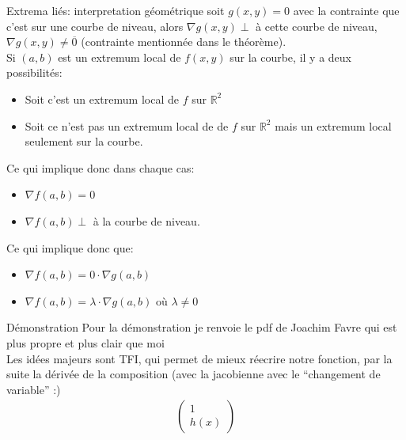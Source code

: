 \begin{parag}{Extrema liés: interpretation géométrique}
    soit $g\left(x, y\right) = 0 $ avec la contrainte que c'est sur une courbe de niveau, alors $\nabla g\left(x, y\right) \perp $ à cette courbe de niveau, $\nabla g\left(x, y\right) \neq \overline{0}$ (contrainte mentionnée dans le théorème).\\
    Si $\left(a, b\right)$ est un extremum local de $f\left(x, y\right)$ sur la courbe, il y a deux possibilités:
    \begin{itemize}
        \item Soit c'est un extremum local de $f$ sur $\mathbb{R}^{2}$
        \item Soit ce n'est pas un extremum local de de $f$ sur $\mathbb{R}^{2}$ mais un extremum local seulement sur la courbe.
    \end{itemize}
    Ce qui implique donc dans chaque cas:
    \begin{itemize}
        \item $\nabla f\left(a, b\right) = 0$
        \item $\nabla f\left(a, b\right) \perp$ à la courbe de niveau.
    \end{itemize}
    Ce qui implique donc que:
    \begin{itemize}
        \item $\nabla f\left(a, b\right) = 0 \cdot \nabla g\left(a, b\right)$
        \item $\nabla f\left(a, b\right) =  \lambda \cdot  \nabla g\left(a, b\right)$ où $\lambda \neq 0$
    \end{itemize}
    
\end{parag}

\begin{parag}{Démonstration}
    Pour la démonstration je renvoie le pdf de Joachim Favre qui est plus propre et plus clair que moi \\
Les idées majeurs sont TFI, qui permet de mieux réecrire notre fonction, par la suite la dérivée de la composition (avec la jacobienne avec le ``changement de variable''  :)
\begin{align*} \begin{pmatrix} 1 \\h\left(x\right)  \end{pmatrix}  \end{align*}



\end{parag}

